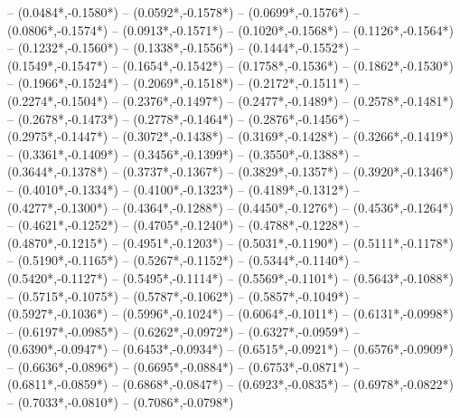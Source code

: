 {	-- ({0.0484*\dx},{-0.1580*\dy})
	-- ({0.0592*\dx},{-0.1578*\dy})
	-- ({0.0699*\dx},{-0.1576*\dy})
	-- ({0.0806*\dx},{-0.1574*\dy})
	-- ({0.0913*\dx},{-0.1571*\dy})
	-- ({0.1020*\dx},{-0.1568*\dy})
	-- ({0.1126*\dx},{-0.1564*\dy})
	-- ({0.1232*\dx},{-0.1560*\dy})
	-- ({0.1338*\dx},{-0.1556*\dy})
	-- ({0.1444*\dx},{-0.1552*\dy})
	-- ({0.1549*\dx},{-0.1547*\dy})
	-- ({0.1654*\dx},{-0.1542*\dy})
	-- ({0.1758*\dx},{-0.1536*\dy})
	-- ({0.1862*\dx},{-0.1530*\dy})
	-- ({0.1966*\dx},{-0.1524*\dy})
	-- ({0.2069*\dx},{-0.1518*\dy})
	-- ({0.2172*\dx},{-0.1511*\dy})
	-- ({0.2274*\dx},{-0.1504*\dy})
	-- ({0.2376*\dx},{-0.1497*\dy})
	-- ({0.2477*\dx},{-0.1489*\dy})
	-- ({0.2578*\dx},{-0.1481*\dy})
	-- ({0.2678*\dx},{-0.1473*\dy})
	-- ({0.2778*\dx},{-0.1464*\dy})
	-- ({0.2876*\dx},{-0.1456*\dy})
	-- ({0.2975*\dx},{-0.1447*\dy})
	-- ({0.3072*\dx},{-0.1438*\dy})
	-- ({0.3169*\dx},{-0.1428*\dy})
	-- ({0.3266*\dx},{-0.1419*\dy})
	-- ({0.3361*\dx},{-0.1409*\dy})
	-- ({0.3456*\dx},{-0.1399*\dy})
	-- ({0.3550*\dx},{-0.1388*\dy})
	-- ({0.3644*\dx},{-0.1378*\dy})
	-- ({0.3737*\dx},{-0.1367*\dy})
	-- ({0.3829*\dx},{-0.1357*\dy})
	-- ({0.3920*\dx},{-0.1346*\dy})
	-- ({0.4010*\dx},{-0.1334*\dy})
	-- ({0.4100*\dx},{-0.1323*\dy})
	-- ({0.4189*\dx},{-0.1312*\dy})
	-- ({0.4277*\dx},{-0.1300*\dy})
	-- ({0.4364*\dx},{-0.1288*\dy})
	-- ({0.4450*\dx},{-0.1276*\dy})
	-- ({0.4536*\dx},{-0.1264*\dy})
	-- ({0.4621*\dx},{-0.1252*\dy})
	-- ({0.4705*\dx},{-0.1240*\dy})
	-- ({0.4788*\dx},{-0.1228*\dy})
	-- ({0.4870*\dx},{-0.1215*\dy})
	-- ({0.4951*\dx},{-0.1203*\dy})
	-- ({0.5031*\dx},{-0.1190*\dy})
	-- ({0.5111*\dx},{-0.1178*\dy})
	-- ({0.5190*\dx},{-0.1165*\dy})
	-- ({0.5267*\dx},{-0.1152*\dy})
	-- ({0.5344*\dx},{-0.1140*\dy})
	-- ({0.5420*\dx},{-0.1127*\dy})
	-- ({0.5495*\dx},{-0.1114*\dy})
	-- ({0.5569*\dx},{-0.1101*\dy})
	-- ({0.5643*\dx},{-0.1088*\dy})
	-- ({0.5715*\dx},{-0.1075*\dy})
	-- ({0.5787*\dx},{-0.1062*\dy})
	-- ({0.5857*\dx},{-0.1049*\dy})
	-- ({0.5927*\dx},{-0.1036*\dy})
	-- ({0.5996*\dx},{-0.1024*\dy})
	-- ({0.6064*\dx},{-0.1011*\dy})
	-- ({0.6131*\dx},{-0.0998*\dy})
	-- ({0.6197*\dx},{-0.0985*\dy})
	-- ({0.6262*\dx},{-0.0972*\dy})
	-- ({0.6327*\dx},{-0.0959*\dy})
	-- ({0.6390*\dx},{-0.0947*\dy})
	-- ({0.6453*\dx},{-0.0934*\dy})
	-- ({0.6515*\dx},{-0.0921*\dy})
	-- ({0.6576*\dx},{-0.0909*\dy})
	-- ({0.6636*\dx},{-0.0896*\dy})
	-- ({0.6695*\dx},{-0.0884*\dy})
	-- ({0.6753*\dx},{-0.0871*\dy})
	-- ({0.6811*\dx},{-0.0859*\dy})
	-- ({0.6868*\dx},{-0.0847*\dy})
	-- ({0.6923*\dx},{-0.0835*\dy})
	-- ({0.6978*\dx},{-0.0822*\dy})
	-- ({0.7033*\dx},{-0.0810*\dy})
	-- ({0.7086*\dx},{-0.0798*\dy})
}
